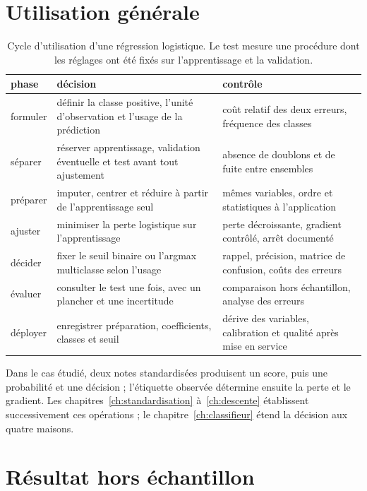 \section{Utilisation générale}

\begin{table}[htbp]
\centering
\small
\begin{tabularx}{\textwidth}{
  >{\raggedright\arraybackslash}p{29mm}
  >{\raggedright\arraybackslash}X
  >{\raggedright\arraybackslash}p{49mm}}
\toprule
phase & décision & contrôle \\
\midrule
formuler & définir la classe positive, l'unité d'observation et l'usage de la
  prédiction & coût relatif des deux erreurs, fréquence des classes \\
séparer & réserver apprentissage, validation éventuelle et test avant tout
  ajustement & absence de doublons et de fuite entre ensembles \\
préparer & imputer, centrer et réduire à partir de l'apprentissage seul
  & mêmes variables, ordre et statistiques à l'application \\
ajuster & minimiser la perte logistique sur l'apprentissage
  & perte décroissante, gradient contrôlé, arrêt documenté \\
décider & fixer le seuil binaire ou l'argmax multiclasse selon l'usage
  & rappel, précision, matrice de confusion, coûts des erreurs \\
évaluer & consulter le test une fois, avec un plancher et une incertitude
  & comparaison hors échantillon, analyse des erreurs \\
déployer & enregistrer préparation, coefficients, classes et seuil
  & dérive des variables, calibration et qualité après mise en service \\
\bottomrule
\end{tabularx}
\caption{Cycle d'utilisation d'une régression logistique. Le test mesure une
procédure dont les réglages ont été fixés sur l'apprentissage et la validation.}
\label{tab:cycle-logistique}
\end{table}
\FloatBarrier

Dans le cas étudié, deux notes standardisées produisent un score, puis une
probabilité et une décision ; l'étiquette observée détermine ensuite la perte et
le gradient. Les chapitres~\ref{ch:standardisation} à~\ref{ch:descente}
établissent successivement ces opérations ; le
chapitre~\ref{ch:classifieur} étend la décision aux quatre maisons.

\section{Résultat hors échantillon}


